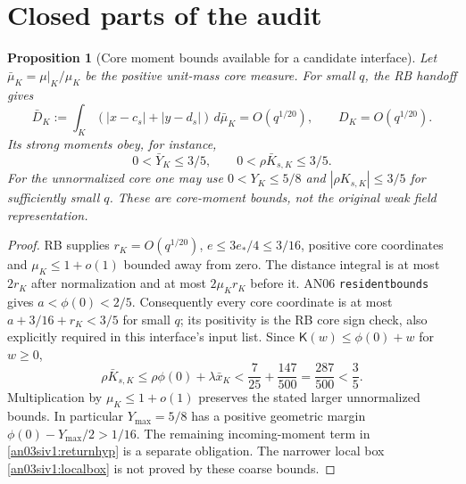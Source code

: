 \documentclass[11pt]{article}
\numberwithin{equation}{section}
\newtheorem{proposition}{Proposition}[section]
\theoremstyle{remark}\newtheorem{remark}[proposition]{Remark}
\newcommand{\dd}{\,d}\newcommand{\E}{\mathbb E}
\newcommand{\Kfun}{\mathsf K}\newcommand{\Ffun}{\mathsf F}
\begin{document}
\section{Closed parts of the audit}
\begin{proposition}[Core moment bounds available for a candidate interface]
\label{an03siv1:coremoments}
Let $\bar\mu_K=\mu|_K/\mu_K$ be the positive unit-mass core measure.
For small $q$, the RB handoff gives
\begin{equation}
 \bar D_K:=\int_K(|x-c_s|+|y-d_s|)\dd\bar\mu_K
       =O(q^{1/20}),\qquad D_K=O(q^{1/20}).
 \label{an03siv1:Dcore}
\end{equation}
Its strong moments obey, for instance,
\begin{equation}
 0<\bar Y_K\le3/5,\qquad
 0<\rho\bar K_{s,K}\le3/5.
 \label{an03siv1:normalizedmoments}
\end{equation}
For the unnormalized core one may use $0<Y_K\le5/8$ and
$|\rho K_{s,K}|\le3/5$ for sufficiently small $q$.
These are core-moment bounds, not the original weak field representation.
\end{proposition}
\begin{proof}
RB supplies $r_K=O(q^{1/20})$, $e\le3e_*/4\le3/16$,
positive core coordinates and $\mu_K\le1+o(1)$ bounded away
from zero. The distance integral is at most $2r_K$ after
normalization and at most $2\mu_Kr_K$ before it.
AN06 \texttt{residentbounds} gives $a<\phi(0)<2/5$.
Consequently every core coordinate is at most
$a+3/16+r_K<3/5$ for small $q$; its positivity is the RB core
sign check, also explicitly required in this interface's input list.
Since $\Kfun(w)\le\phi(0)+w$ for $w\ge0$,
\[
 \rho\bar K_{s,K}\le\rho\phi(0)+\lambda\bar x_K
 <\frac7{25}+\frac{147}{500}=\frac{287}{500}<\frac35.
\]
Multiplication by $\mu_K\le1+o(1)$ preserves the stated larger
unnormalized bounds. In particular $Y_{\max}=5/8$ has a positive
geometric margin $\phi(0)-Y_{\max}/2>1/16$.
The remaining incoming-moment term in \eqref{an03siv1:returnhyp}
is a separate obligation. The narrower local box
\eqref{an03siv1:localbox} is not proved by these coarse bounds.
\end{proof}
\end{document}

